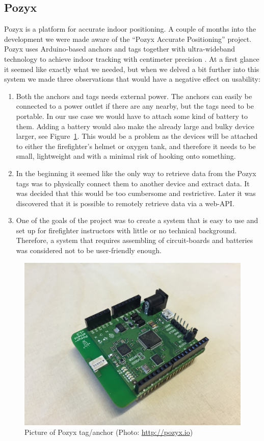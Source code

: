 \documentclass[../Main/thesis.tex]{subfiles}
\begin{document}
\subsection{Pozyx}
Pozyx is a platform for accurate indoor positioning.
A couple of months into the development we were made aware of the ``Pozyx Accurate Positioning'' project.
Pozyx uses Arduino-based anchors and tags together with ultra-wideband technology to achieve indoor tracking with centimeter precision \citep{Pozyx2017}.
At a first glance it seemed like exactly what we needed, but when we delved a bit further into this system we made three observations that would have a negative effect on usability:
\begin{enumerate}
	\item{Both the anchors and tags needs external power. 
		The anchors can easily be connected to a power outlet if there are any nearby, but the tags need to be portable.
		In our use case we would have to attach some kind of battery to them.
		Adding a battery would also make the already large and bulky device larger, see Figure~\ref{fig:pozyx_tag}.
		This would be a problem as the devices will be attached to either the firefighter's helmet or oxygen tank, and therefore it needs to be small, lightweight and with a minimal risk of hooking onto something.
	}

	\item{In the beginning it seemed like the only way to retrieve data from the Pozyx tags was to physically connect them to another device and extract data.
		It was decided that this would be too cumbersome and restrictive.
		Later it was discovered that it is possible to remotely retrieve data via a web-API.}

	\item{One of the goals of the project was to create a system that is easy to use and set up for firefighter instructors with little or no technical background.
		Therefore, a system that requires assembling of circuit-boards and batteries was considered not to be user-friendly enough.}
\end{enumerate}

\begin{figure}
	\centering
	\includegraphics[width=0.5\linewidth]{../fig/pozyx_tag}
	\caption[Picture of Pozyx tag/anchor]{Picture of Pozyx tag/anchor (Photo: \url{http://pozyx.io})}
	\label{fig:pozyx_tag}
\end{figure}
\end{document}
